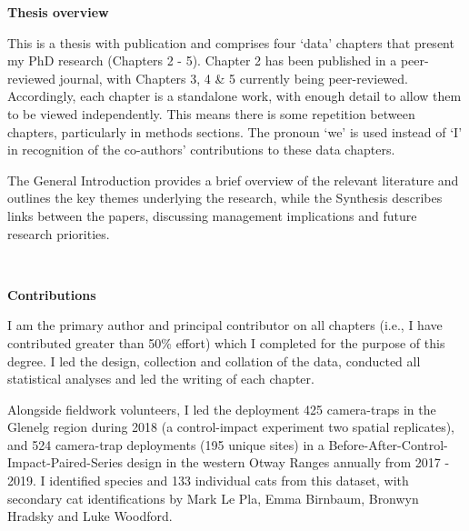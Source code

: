 \documentclass[11pt,a4paper,titlepage,twoside,openright]{style/unimelbthesis}
\begin{document}
\begin{frontmatter}
\begin{preface}
    \textbf{Thesis overview}

    This is a thesis with publication and comprises four `data' chapters that present my PhD research (Chapters 2 - 5). Chapter 2 has been published in a peer-reviewed journal, with Chapters 3, 4 \& 5 currently being peer-reviewed. Accordingly, each chapter is a standalone work, with enough detail to allow them to be viewed independently. This means there is some repetition between chapters, particularly in methods sections. The pronoun `we' is used instead of `I' in recognition of the co-authors' contributions to these data chapters.

    The General Introduction provides a brief overview of the relevant literature and outlines the key themes underlying the research, while the Synthesis describes links between the papers, discussing management implications and future research priorities.

    \(~\)

    \textbf{Contributions}

    I am the primary author and principal contributor on all chapters (i.e., I have contributed greater than 50\% effort) which I completed for the purpose of this degree. I led the design, collection and collation of the data, conducted all statistical analyses and led the writing of each chapter.

    Alongside fieldwork volunteers, I led the deployment 425 camera-traps in the Glenelg region during 2018 (a control-impact experiment two spatial replicates), and 524 camera-trap deployments (195 unique sites) in a Before-After-Control-Impact-Paired-Series design in the western Otway Ranges annually from 2017 - 2019. I identified species and 133 individual cats from this dataset, with secondary cat identifications by Mark Le Pla, Emma Birnbaum, Bronwyn Hradsky and Luke Woodford.


\end{preface}
\end{frontmatter}
\end{document}

